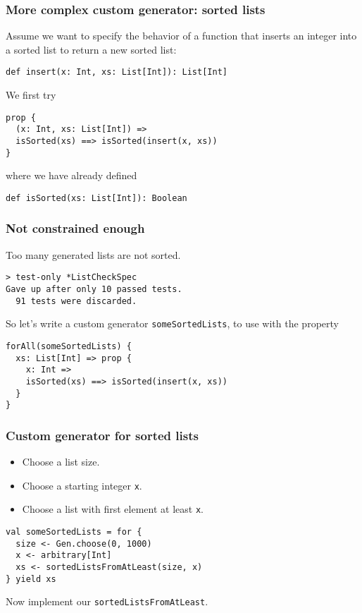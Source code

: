 \begin{frame}[fragile]
  \frametitle{More complex custom generator: sorted lists}

  Assume we want to specify the behavior of a function that inserts an integer into a sorted list to return a new sorted list:
  \begin{verbatim}
def insert(x: Int, xs: List[Int]): List[Int]
  \end{verbatim}

  We first try
  \begin{verbatim}
prop {
  (x: Int, xs: List[Int]) =>
  isSorted(xs) ==> isSorted(insert(x, xs))
}
  \end{verbatim}

  where we have already defined
  \begin{verbatim}
def isSorted(xs: List[Int]): Boolean
  \end{verbatim}

\end{frame}

\begin{frame}[fragile]
  \frametitle{Not constrained enough}

  Too many generated lists are not sorted.

  \begin{verbatim}
> test-only *ListCheckSpec
Gave up after only 10 passed tests.
  91 tests were discarded.
  \end{verbatim}

  So let's write a custom generator \texttt{someSortedLists}, to use with the property
  \begin{verbatim}
forAll(someSortedLists) {
  xs: List[Int] => prop {
    x: Int =>
    isSorted(xs) ==> isSorted(insert(x, xs))
  }
}
  \end{verbatim}
\end{frame}

\begin{frame}[fragile]
  \frametitle{Custom generator for sorted lists}

  \begin{itemize}
    \item Choose a list size.
    \item Choose a starting integer \texttt{x}.
    \item Choose a list with first element at least \texttt{x}.
  \end{itemize}

  \begin{verbatim}
val someSortedLists = for {
  size <- Gen.choose(0, 1000)
  x <- arbitrary[Int]
  xs <- sortedListsFromAtLeast(size, x)
} yield xs
  \end{verbatim}

  Now implement our \texttt{sortedListsFromAtLeast}.
\end{frame}

